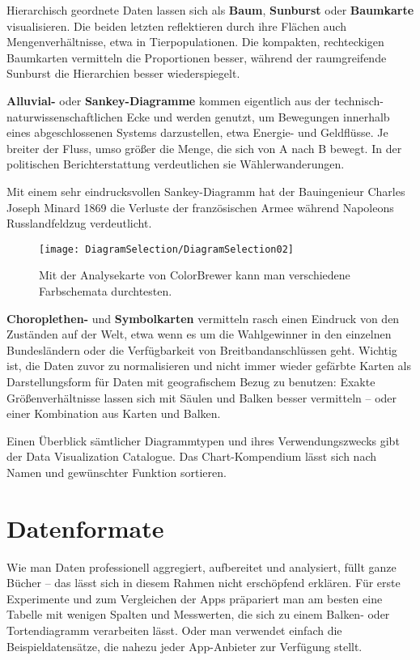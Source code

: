 Hierarchisch geordnete Daten lassen sich als \textbf{Baum}, \textbf{Sunburst} oder \textbf{Baumkarte} visualisieren. Die beiden letzten reflektieren durch ihre Flächen auch Mengenverhältnisse, etwa in Tierpopulationen. Die kompakten, rechteckigen Baumkarten vermitteln die Proportionen besser, während der raumgreifende Sunburst die Hierarchien besser wiederspiegelt.
	
\textbf{Alluvial-} oder \textbf{Sankey-Diagramme} kommen eigentlich aus der technisch-naturwissenschaftlichen Ecke und werden genutzt, um Bewegungen innerhalb eines abgeschlossenen Systems darzustellen, etwa Energie- und Geldflüsse. Je breiter der Fluss, umso größer die Menge, die sich von A nach B bewegt. In der politischen Berichterstattung verdeutlichen sie Wählerwanderungen.
	
Mit einem sehr eindrucksvollen Sankey-Diagramm hat der Bauingenieur Charles Joseph Minard 1869 die Verluste der französischen Armee während Napoleons Russlandfeldzug verdeutlicht.

\begin{figure}
	\texttt{[image: DiagramSelection/DiagramSelection02]}
	\caption[Analysekarte]{Mit der Analysekarte von ColorBrewer kann man verschiedene Farbschemata durchtesten.}
\end{figure}

\textbf{Choroplethen-} und \textbf{Symbolkarten} vermitteln rasch einen Eindruck von den Zuständen auf der Welt, etwa wenn es um die Wahlgewinner in den einzelnen Bundesländern oder die Verfügbarkeit von Breitbandanschlüssen geht. Wichtig ist, die Daten zuvor zu normalisieren und nicht immer wieder gefärbte Karten als Darstellungsform für Daten mit geografischem Bezug zu benutzen: Exakte Größenverhältnisse lassen sich mit Säulen und Balken besser vermitteln – oder einer Kombination aus Karten und Balken.

Einen Überblick sämtlicher Diagrammtypen und ihres Verwendungszwecks gibt der Data Visualization Catalogue. Das Chart-Kompendium lässt sich nach Namen und gewünschter Funktion sortieren.

\section{Datenformate}

Wie man Daten professionell aggregiert, aufbereitet und analysiert, füllt ganze Bücher – das lässt sich in diesem Rahmen nicht erschöpfend erklären. Für erste Experimente und zum Vergleichen der Apps präpariert man am besten eine Tabelle mit wenigen Spalten und Messwerten, die sich zu einem Balken- oder Tortendiagramm verarbeiten lässt. Oder man verwendet einfach die Beispieldatensätze, die nahezu jeder App-Anbieter zur Verfügung stellt.
	
